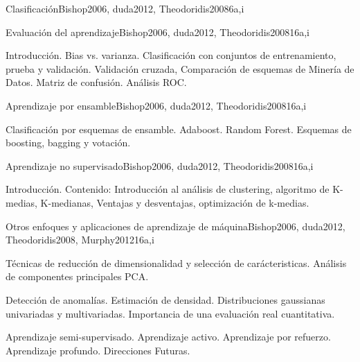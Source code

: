\begin{syllabus}
\begin{unit}{Clasificación}{}{Bishop2006, duda2012, Theodoridis2008}{6}{a,i}
\begin{topics}
\end{topics}

\end{unit}

\begin{unit}{Evaluación del aprendizaje}{}{Bishop2006, duda2012, Theodoridis2008}{16}{a,i}
\begin{topics}
      \item Introducción. Bias vs. varianza. Clasificación con conjuntos de entrenamiento, prueba y validación. Validación cruzada, Comparación de esquemas de Minería de Datos. Matriz de confusión. Análisis ROC.
   \end{topics}

\end{unit}

\begin{unit}{Aprendizaje por ensamble}{}{Bishop2006, duda2012, Theodoridis2008}{16}{a,i}
\begin{topics}
      \item Clasificación por esquemas de ensamble. Adaboost. Random Forest. Esquemas de boosting, bagging y votación.
   \end{topics}

\end{unit}

\begin{unit}{Aprendizaje no supervisado}{}{Bishop2006, duda2012, Theodoridis2008}{16}{a,i}
\begin{topics}
      \item Introducción. Contenido: Introducción al análisis de clustering, algoritmo de K-medias, K-medianas, Ventajas y desventajas, optimización de k-medias.
   \end{topics}

\end{unit}

\begin{unit}{Otros enfoques y aplicaciones de aprendizaje de máquina}{}{Bishop2006, duda2012, Theodoridis2008, Murphy2012}{16}{a,i}
\begin{topics}
      \item Técnicas de reducción de dimensionalidad y selección de carácteristicas. Análisis de componentes principales PCA.
      \item Detección de anomalías. Estimación de densidad. Distribuciones gaussianas univariadas y multivariadas. Importancia de una evaluación real cuantitativa.
      \item Aprendizaje semi-supervisado. Aprendizaje activo. Aprendizaje por refuerzo. Aprendizaje profundo. Direcciones Futuras.
   \end{topics}
\end{unit}



\begin{coursebibliography}
\end{coursebibliography}

\end{syllabus}
